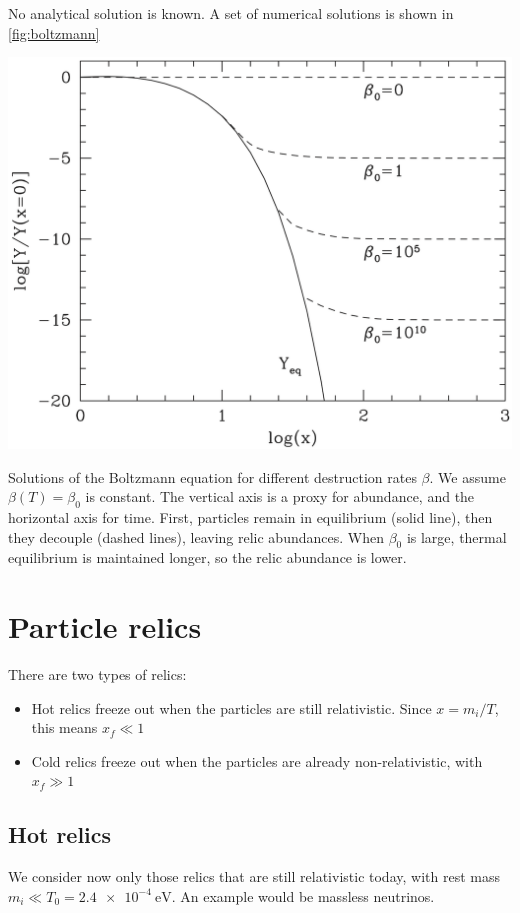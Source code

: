 No analytical solution is known. A set of numerical solutions is shown in \cref{fig:boltzmann}

\begin{marginfigure}
	\centering
	\includegraphics[width=\textwidth]{img/ch-02/boltzmann.png}
	\caption{Solutions of the Boltzmann equation for different destruction rates $\beta$. We assume $\beta(T) = \beta_0$ is constant. The vertical axis is a proxy for abundance, and the horizontal axis for time. First, particles remain in equilibrium (solid line), then they decouple (dashed lines), leaving relic abundances. When $\beta_0$ is large, thermal equilibrium is maintained longer, so the relic abundance is lower.}
	\label{fig:boltzmann}
\end{marginfigure}


\section{Particle relics}
There are two types of relics:
\begin{itemize}
	\item Hot relics freeze out when the particles are still relativistic. Since $x = m_i / T$, this means $x_f \ll 1$
	\item Cold relics freeze out when the particles are already non-relativistic, with $x_f \gg 1$
\end{itemize}

\subsection{Hot relics}
We consider now only those relics that are still relativistic today, with rest mass $m_i \ll T_0 = \SI{2.4e-4}{\eV}$. An example would be massless neutrinos.


